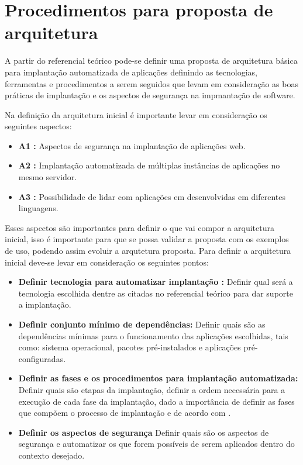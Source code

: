 \section{Procedimentos para proposta de arquitetura}

A partir do referencial teórico pode-se definir uma proposta de
arquitetura básica para implantação automatizada de aplicações definindo as
tecnologias, ferramentas e  procedimentos a serem seguidos que levam em consideração as boas
práticas de implantação e os aspectos de segurança na impmantação de software.

Na definição da arquitetura inicial é importante levar em consideração os seguintes
aspectos:

\begin{itemize}
  \item  \textbf{A1 :} Aspectos de segurança na implantação de aplicações web.
  \item  \textbf{A2 :} Implantação automatizada de múltiplas instâncias de
   aplicações no mesmo servidor.
  \item  \textbf{A3 :} Possibilidade de lidar com aplicações em desenvolvidas em
  diferentes linguagens.
\end{itemize}

Esses aspectos são importantes para definir o que vai compor a arquitetura inicial,
isso é importante para que se possa validar a proposta com os exemplos de uso,
podendo assim evoluir a arqutetura proposta. Para definir a arquitetura inicial
deve-se levar em consideração os seguintes pontos:

\begin{itemize}
  \item  \textbf{Definir tecnologia para automatizar implantação :}  Definir qual será a
  tecnologia escolhida dentre as citadas no referencial teórico para dar suporte
  a implantação.
  \item  \textbf{Definir conjunto mínimo de dependências:} Definir quais são as dependências
  mínimas para o funcionamento das aplicações escolhidas, tais como: sistema operacional,
  pacotes pré-instalados e aplicações pré-configuradas.
  \item  \textbf{Definir as fases e os procedimentos para implantação automatizada:}
   Definir quais são etapas da implantação, definir a ordem necessária para a execução de
  cada fase da implantação, dado a importância de definir as fases que compõem o processo de
  implantação e de acordo com \cite{omg2006}.
  \item  \textbf{Definir os aspectos de segurança} Definir quais são os aspectos de segurança
  e automatizar os que forem possíveis de serem aplicados dentro do contexto desejado.
\end{itemize}

